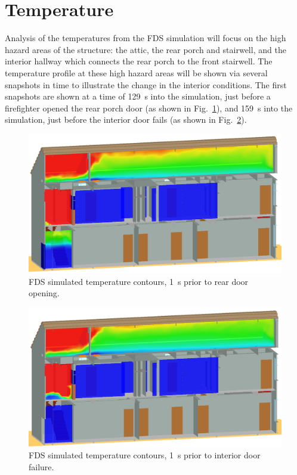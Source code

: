 \documentclass[12pt,oneside]{book}
\begin{document}
\section{Temperature}
\label{temp}
Analysis of the temperatures from the FDS simulation will focus on the high hazard areas of the structure: the attic, the rear porch and stairwell, and the interior hallway which connects the rear porch to the front stairwell. The temperature profile at these high hazard areas will be shown via several snapshots in time to illustrate the change in the interior conditions. The first snapshots are shown at a time of 129~s into the simulation, just before a firefighter opened the rear porch door (as shown in Fig.~\ref{fig:temp_129s}), and 159~s into the simulation, just before the interior door fails (as shown in Fig.~\ref{fig:temp_159s}).

\begin{figure}[!ht]
\includegraphics[width=.675\textwidth]{../Figures/west_50th_baseline_129}
 

\caption{FDS simulated temperature contours, 1~s prior to rear door opening.}
\label{fig:temp_129s}
\end{figure}

\begin{figure}[!ht]
\includegraphics[width=.675\textwidth]{../Figures/west_50th_baseline_159}
 

\caption{FDS simulated temperature contours, 1~s prior to interior door failure.}
\label{fig:temp_159s}
\end{figure}
\end{document}
